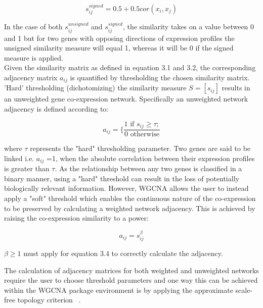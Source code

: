 \begin{equation}
    s_{ij}^{signed} = 0.5 + 0.5cor(x_i, x_j)
\end{equation}

In the case of both $s_{ij}^{unsigned}$ and $s_{ij}^{signed}$, the similarity takes on a value between 0 and 1 but for two genes with opposing directions of expression profiles the unsigned similarity measure will equal 1, whereas it will be 0 if the signed measure is applied. \\

Given the similarity matrix as defined in equation 3.1 and 3.2, the corresponding adjacency matrix \textit{$a_{ij}$} is quantified by thresholding the chosen similarity matrix. 'Hard' thresholding (dichotomizing) the similarity measure $S = [s_{ij}]$ results in an unweighted gene co-expression network. Specifically an unweighted network adjacency is defined according to:

\begin{equation}
    a_{ij} = \bigg\{\frac{1 \text{ if } s_{ij} \geq \tau;}{0 \text{ otherwise}}
\end{equation}

where $\tau$ represents the "hard" thresholding parameter. Two genes are said to be linked i.e. \textit{$a_{ij}$} =1, when the absolute correlation between their expression profiles is greater than $\tau$. As the relationship between any two genes is classified in a binary manner, using a "hard" threshold can result in the loss of potentially biologically relevant information. However, WGCNA allows the user to instead apply a "soft" threshold which enables the continuous nature of the co-expression to be preserved by calculating a weighted network adjacency. This is achieved by raising the co-expression similarity to a power: 

\begin{equation}
    a_{ij} = s_{ij}^{\beta}
\end{equation}

$\beta \geq 1$ must apply for equation 3.4 to correctly calculate the adjacency. 

The calculation of adjacency matrices for both weighted and unweighted networks require the user to choose threshold parameters and one way this can be achieved within the WGCNA package environment is by applying the approximate scale-free topology criterion ~\autocite{Zha2005}.


